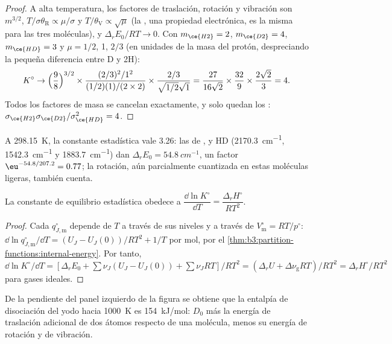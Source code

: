\begin{proof}
A alta temperatura, los factores de traslación, rotación y vibración son
$m^{3/2}$, $T/\sigma\theta_{\mathrm R} \propto \mu/\sigma$ y $T/\theta_{\mathrm V} \propto \sqrt\mu$ (la , una
propiedad electrónica, es la misma para las tres moléculas), y $\Delta_rE_0/RT \to 0$.
Con $m_{\ce{H2}} = 2$, $m_{\ce{D2}} = 4$, $m_{\ce{HD}} = 3$ y $\mu = 1/2$, 1, $2/3$ (en unidades de la
masa del protón, despreciando la pequeña diferencia entre D y 2H):
\[
  K^\circ \to \Bigl(\frac{9}{8}\Bigr)^{3/2} \times \frac{(2/3)^2/1^2}{(1/2)(1)/(2 \times 2)}
  \times \frac{2/3}{\sqrt{1/2}\sqrt1}
  = \frac{27}{16\sqrt2} \times \frac{32}{9} \times \frac{2\sqrt2}{3} = 4 .
\]
Todos los factores de masa se cancelan exactamente, y solo quedan los : $\sigma_{\ce{H2}}
\sigma_{\ce{D2}}/\sigma_{\ce{HD}}^2 = 4$.
\end{proof}

A \qty{298.15}{K}, la constante estadística vale 3.26: las  de ,
 y HD (\qty{2170.3}{cm^{-1}}, \qty{1542.3}{cm^{-1}} y \qty{1883.7}{cm^{-1}}) dan $\Delta_rE_0 =
\qty{54.8}{cm^{-1}}$, un factor $\eu^{-54.8/207.2} = 0.77$; la rotación, aún parcialmente cuantizada en
estas moléculas ligeras, también cuenta.

\begin{proposition}\label{prop:b3:statistical-thermo-applied:vant-hoff-stat}
La constante de equilibrio estadística obedece a $\dfrac{\dd\ln K^\circ}{\dd T} = \dfrac{\Delta_rH^\circ}{RT^2}$.
\end{proposition}

\begin{proof}
Cada $q^\circ_{J,\mathrm m}$ depende de $T$ a través de sus niveles y a través de $V^\circ_{\mathrm m} = RT/p^\circ$:
$\dd\ln q^\circ_{J,\mathrm m}/\dd T = (U_J - U_J(0))/RT^2 + 1/T$ por mol, por el
\cref{thm:b3:partition-functions:internal-energy}. Por tanto, $\dd\ln K^\circ/\dd T =
[\Delta_rE_0 + \sum\nu_J(U_J - U_J(0)) + \sum\nu_JRT]/RT^2 = (\Delta_rU + \Delta\nu_{\mathrm g}RT)/RT^2 =
\Delta_rH^\circ/RT^2$ para gases ideales.
\end{proof}

De la pendiente del panel izquierdo de la figura se obtiene que la entalpía de disociación del
yodo hacia \qty{1000}{K} es \qty{154}{kJ/mol}: $D_0$ más la energía de traslación
adicional de dos átomos respecto de una molécula, menos su energía de rotación y de
vibración.

